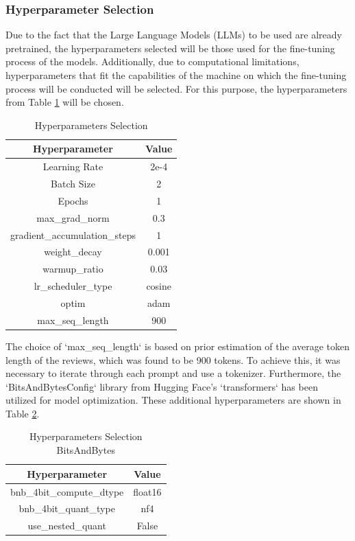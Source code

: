 \subsubsection{Hyperparameter Selection}
Due to the fact that the Large Language Models (LLMs) to be used are already pretrained, the hyperparameters selected will be those used for the fine-tuning process of the models. Additionally, due to computational limitations, hyperparameters that fit the capabilities of the machine on which the fine-tuning process will be conducted will be selected. For this purpose, the hyperparameters from Table \ref{table:hyperparameters} will be chosen.
\begin{table}[H]
    \centering
    \begin{tabular}{|c|c|}
        \hline
        \textbf{Hyperparameter} & \textbf{Value} \\
        \hline
        Learning Rate & 2e-4 \\
        Batch Size & 2 \\
        Epochs & 1 \\
        max\_grad\_norm & 0.3 \\
        gradient\_accumulation\_steps & 1 \\
        weight\_decay & 0.001 \\
        warmup\_ratio & 0.03 \\
        lr\_scheduler\_type & cosine \\
        optim & adam \\
        max\_seq\_length & 900 \\
        \hline
    \end{tabular}
    \caption{Hyperparameters Selection}
    \label{table:hyperparameters}
\end{table}
The choice of `max\_seq\_length` is based on prior estimation of the average token length of the reviews, which was found to be 900 tokens. To achieve this, it was necessary to iterate through each prompt and use a tokenizer. Furthermore, the `BitsAndBytesConfig` library from Hugging Face's `transformers` has been utilized for model optimization. These additional hyperparameters are shown in Table \ref{table:hyperparameters-bitsandbytes}.
\begin{table}[H]
    \centering
    \begin{tabular}{|c|c|}
        \hline
        \textbf{Hyperparameter} & \textbf{Value} \\
        \hline
        bnb\_4bit\_compute\_dtype & float16 \\
        bnb\_4bit\_quant\_type & nf4 \\
        use\_nested\_quant & False \\
        \hline
    \end{tabular}
    \caption{Hyperparameters Selection BitsAndBytes}
    \label{table:hyperparameters-bitsandbytes}
\end{table}

